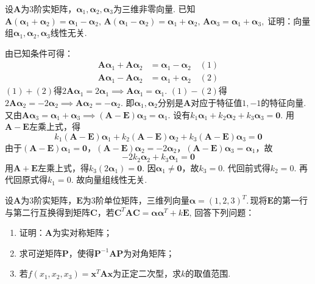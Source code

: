 \documentclass[12pt, a4paper, oneside, UTF8]{ctexbook}
\begin{document}
\begin{exercise}
    设$\bm{A}$为$3$阶实矩阵，$\bm{\alpha}_1,\bm{\alpha}_2,\bm{\alpha}_3$为三维非零向量. 已知$\bm{A}(\bm{\alpha}_1+\bm{\alpha}_2) = \bm{\alpha}_1-\bm{\alpha}_2,\, \bm{A}(\bm{\alpha}_1-\bm{\alpha}_2) = \bm{\alpha}_1+\bm{\alpha}_2,\, \bm{A}\bm{\alpha}_3 = \bm{\alpha}_1+\bm{\alpha}_3,\;$证明：向量组$\bm{\alpha}_1,\bm{\alpha}_2,\bm{\alpha}_3$线性无关.
\end{exercise}
\begin{solution}
    由已知条件可得：
    \begin{align*}
        \bm{A}\bm{\alpha}_1 + \bm{A}\bm{\alpha}_2 &= \bm{\alpha}_1 - \bm{\alpha}_2 \quad (1) \\
        \bm{A}\bm{\alpha}_1 - \bm{A}\bm{\alpha}_2 &= \bm{\alpha}_1 + \bm{\alpha}_2 \quad (2)
    \end{align*}
    $(1)+(2)$得$2\bm{A}\bm{\alpha}_1 = 2\bm{\alpha}_1 \implies \bm{A}\bm{\alpha}_1 = \bm{\alpha}_1$.
    $(1)-(2)$得$2\bm{A}\bm{\alpha}_2 = -2\bm{\alpha}_2 \implies \bm{A}\bm{\alpha}_2 = -\bm{\alpha}_2$.
    即$\bm{\alpha}_1,\bm{\alpha}_2$分别是$\bm{A}$对应于特征值$1,-1$的特征向量.
    又由$\bm{A}\bm{\alpha}_3 = \bm{\alpha}_1+\bm{\alpha}_3 \implies (\bm{A}-\bm{E})\bm{\alpha}_3 = \bm{\alpha}_1$.
    设有$k_1\bm{\alpha}_1+k_2\bm{\alpha}_2+k_3\bm{\alpha}_3=\bm{0}$.
    用$\bm{A}-\bm{E}$左乘上式，得
    \[ k_1(\bm{A}-\bm{E})\bm{\alpha}_1 + k_2(\bm{A}-\bm{E})\bm{\alpha}_2 + k_3(\bm{A}-\bm{E})\bm{\alpha}_3 = \bm{0} \]
    由于$(\bm{A}-\bm{E})\bm{\alpha}_1 = \bm{0}$，$(\bm{A}-\bm{E})\bm{\alpha}_2 = -2\bm{\alpha}_2$，$(\bm{A}-\bm{E})\bm{\alpha}_3 = \bm{\alpha}_1$，故
    \[ -2k_2\bm{\alpha}_2 + k_3\bm{\alpha}_1 = \bm{0} \]
    用$\bm{A}+\bm{E}$左乘上式，得$k_3(2\bm{\alpha}_1) = \bm{0}$.
    因$\bm{\alpha}_1 \neq \bm{0}$，故$k_3=0$. 代回前式得$k_2=0$. 再代回原式得$k_1=0$.
    故向量组线性无关.
\end{solution}
\begin{exercise}
    设$\bm{A}$为$3$阶实矩阵，$\bm{E}$为$3$阶单位矩阵，三维列向量$\bm{\alpha}=(1,2,3)^T$.\,现将$\bm{E}$的第一行与第二行互换得到矩阵$\bm{C}$，若$\bm{C}^T\bm{AC}=\bm{\alpha\alpha}^T+k\bm{E},\,$回答下列问题：
    \begin{enumerate}[label = (\arabic*)]
        \item 证明：$\bm{A}$为实对称矩阵；
        \item 求可逆矩阵$\bm{P}$，使得$\bm{P}^{-1}\bm{AP}$为对角矩阵；
        \item 若$f(x_1,x_2,x_3)=\bm{x}^T\bm{Ax}$为正定二次型，求$k$的取值范围.
    \end{enumerate}
\end{exercise}
\end{document}
